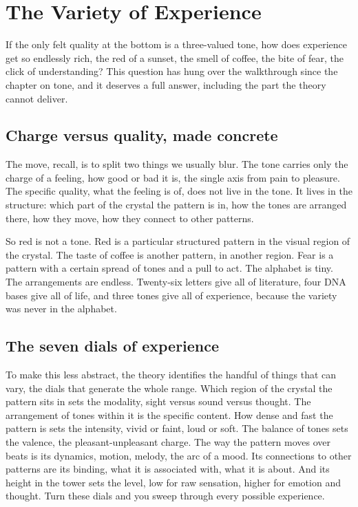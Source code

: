 \section{The Variety of Experience}

If the only felt quality at the bottom is a three-valued tone, how does experience get so endlessly rich, the red of a sunset, the smell of coffee, the bite of fear, the click of understanding? This question has hung over the walkthrough since the chapter on tone, and it deserves a full answer, including the part the theory cannot deliver.

\subsection{Charge versus quality, made concrete}

The move, recall, is to split two things we usually blur. The tone carries only the charge of a feeling, how good or bad it is, the single axis from pain to pleasure. The specific quality, what the feeling is of, does not live in the tone. It lives in the structure: which part of the crystal the pattern is in, how the tones are arranged there, how they move, how they connect to other patterns.

So red is not a tone. Red is a particular structured pattern in the visual region of the crystal. The taste of coffee is another pattern, in another region. Fear is a pattern with a certain spread of tones and a pull to act. The alphabet is tiny. The arrangements are endless. Twenty-six letters give all of literature, four DNA bases give all of life, and three tones give all of experience, because the variety was never in the alphabet.

\subsection{The seven dials of experience}

To make this less abstract, the theory identifies the handful of things that can vary, the dials that generate the whole range. Which region of the crystal the pattern sits in sets the modality, sight versus sound versus thought. The arrangement of tones within it is the specific content. How dense and fast the pattern is sets the intensity, vivid or faint, loud or soft. The balance of tones sets the valence, the pleasant-unpleasant charge. The way the pattern moves over beats is its dynamics, motion, melody, the arc of a mood. Its connections to other patterns are its binding, what it is associated with, what it is about. And its height in the tower sets the level, low for raw sensation, higher for emotion and thought. Turn these dials and you sweep through every possible experience.

